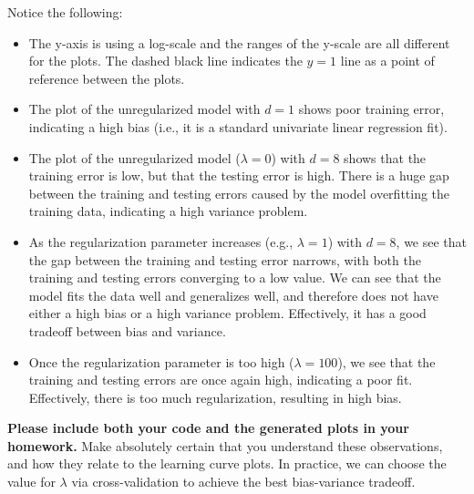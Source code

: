 Notice the following:
\begin{itemize}
\item The y-axis is using a log-scale and the ranges of the y-scale are all different for the plots.  The dashed black line indicates the $y=1$ line as a point of reference between the plots.
\item The plot of the unregularized model with $d = 1$ shows poor training error, indicating a high bias (i.e., it is a standard univariate linear regression fit).
\item The plot of the unregularized model ($\lambda = 0$) with $d = 8$ shows that the training error is low, but that the testing error is high.  There is a huge gap between the training and testing errors caused by the model overfitting the training data, indicating a high variance problem.
\item As the regularization parameter increases (e.g., $\lambda = 1$) with $d = 8$, we see that the gap between the training and testing error narrows, with both the training and testing errors converging to a low value.  We can see that the model fits the data well and generalizes well, and therefore does not have either a high bias or a high variance problem.  Effectively, it has a good tradeoff between bias and variance.
\item Once the regularization parameter is too high ($\lambda = 100$), we see that the training and testing errors are once again high, indicating a poor fit.  Effectively, there is too much regularization, resulting in high bias.
\end{itemize}

\textbf{Please include both your code and the generated plots in your homework.} Make absolutely certain that you understand these observations, and how they relate to the learning curve plots.  In practice, we can choose the value for $\lambda$ via cross-validation to achieve the best bias-variance tradeoff.



